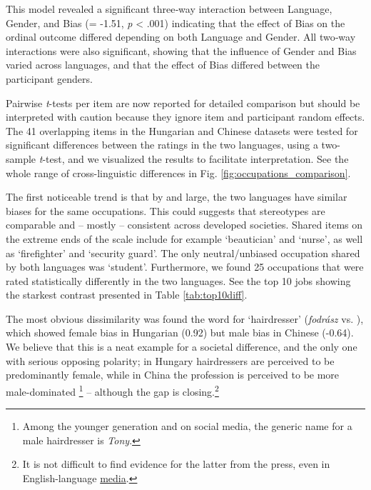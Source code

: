 \documentclass[runningheads]{llncs}
\newcommand{\zh}[1]{\simplifiedchinesefont{#1}\rmfamily}
\begin{document}
This model revealed a significant three‑way interaction between Language, Gender, and Bias (\beta = -1.51, \textit{p} < .001) indicating that the effect of Bias on the ordinal outcome differed depending on both Language and Gender. All two‑way interactions were also significant, showing that the influence of Gender and Bias varied across languages, and that the effect of Bias differed between the participant genders. 

Pairwise \textit{t}-tests per item are now reported for detailed comparison but should be interpreted with caution because they ignore item and participant random effects. 
The 41 overlapping items in the Hungarian and Chinese datasets were tested for significant differences between the ratings in the two languages, using a two-sample \textit{t}-test, and we visualized the results to facilitate interpretation. See the whole range of cross-linguistic differences in Fig. \ref{fig:occupations_comparison}.






The first noticeable trend is that by and large, the two languages have similar biases for the same occupations. This could suggests that stereotypes are comparable and -- mostly -- consistent across developed societies. Shared items on the extreme ends of the scale include for example `beautician' and `nurse', as well as `firefighter' and `security guard'. The only neutral/unbiased occupation shared by both languages was `student'. 
Furthermore, we found 25 occupations that were rated statistically differently in the two languages. See the top 10 jobs showing the starkest contrast presented in Table \ref{tab:top10diff}.

The most obvious dissimilarity was found the word for `hairdresser' (\textit{fodrász} vs. \zh{理发师}), which showed female bias in Hungarian (0.92) but male bias in Chinese (-0.64). We believe that this is a neat example for a societal difference, and the only one with serious opposing polarity; in Hungary hairdressers are perceived to be predominantly female, while in China the profession is perceived to be more male-dominated
\footnote{Among the younger generation and on social media, the generic name for a male hairdresser is \textit{Tony}.}
 -- although the gap is closing.\footnote{It is not difficult to find evidence for the latter from the press, even in English-language \href{https://www.chinadailyhk.com/hk/article/603100\#Women-raise-the-hairdressing-bar--2025-01-23}{media}.}
\end{document}
